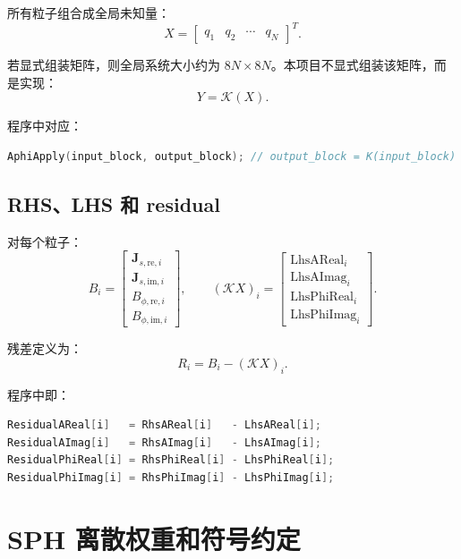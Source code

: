 \documentclass[UTF8,a4paper,11pt]{ctexart}
\newcommand{\Kop}{\mathcal K}
\begin{document}
所有粒子组合成全局未知量：
\begin{equation}
X=\begin{bmatrix}q_1&q_2&\cdots&q_N\end{bmatrix}^T.
\end{equation}

若显式组装矩阵，则全局系统大小约为 $8N\times 8N$。本项目不显式组装该矩阵，而是实现：
\begin{equation}
Y=\Kop(X).
\end{equation}

程序中对应：
\begin{lstlisting}[language=C++]
AphiApply(input_block, output_block); // output_block = K(input_block)
\end{lstlisting}

\subsection{RHS、LHS 和 residual}

对每个粒子：
\begin{equation}
B_i=\begin{bmatrix}
\bm J_{s,\mathrm{re},i}\\
\bm J_{s,\mathrm{im},i}\\
B_{\phi,\mathrm{re},i}\\
B_{\phi,\mathrm{im},i}
\end{bmatrix},
\qquad
(\Kop X)_i=\begin{bmatrix}
\mathrm{LhsAReal}_i\\
\mathrm{LhsAImag}_i\\
\mathrm{LhsPhiReal}_i\\
\mathrm{LhsPhiImag}_i
\end{bmatrix}.
\end{equation}

残差定义为：
\begin{equation}
R_i=B_i-(\Kop X)_i.
\end{equation}

程序中即：
\begin{lstlisting}[language=C++]
ResidualAReal[i]   = RhsAReal[i]   - LhsAReal[i];
ResidualAImag[i]   = RhsAImag[i]   - LhsAImag[i];
ResidualPhiReal[i] = RhsPhiReal[i] - LhsPhiReal[i];
ResidualPhiImag[i] = RhsPhiImag[i] - LhsPhiImag[i];
\end{lstlisting}

\section{SPH 离散权重和符号约定}
\end{document}

